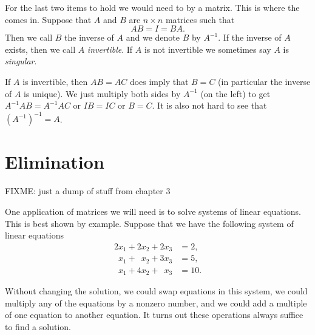 For the last two items to hold we would need to  by
a matrix.  This is where the \emph{} comes in.
Suppose that $A$ and $B$ are $n \times n$ matrices such that
\begin{equation*}
AB = I = BA .
\end{equation*}
Then we call $B$ the inverse of $A$ and we denote $B$ by $A^{-1}$.
If the inverse of $A$ exists, then we call $A$
\emph{invertible}.
If $A$ is not invertible we sometimes say $A$ is
\emph{singular}.

If $A$ is invertible, then $AB = AC$ does imply
that $B = C$ (in particular the inverse of $A$ is unique).
We just multiply both sides by $A^{-1}$ (on the left) to get
$A^{-1}AB = A^{-1}AC$ or $IB=IC$ or $B=C$.
It is also not hard to see that ${(A^{-1})}^{-1} = A$.


\sectionnewpage
\section{Elimination}
\label{elim:section}


FIXME: just a dump of stuff from chapter 3

One application of matrices we will need is to solve systems of
linear equations.  This is best shown by example.
Suppose that we have the following system of linear equations
\begin{align*}
          2 x_1 +           2 x_2 +           2 x_3 & = 2 , \\
\phantom{9} x_1 + \phantom{9} x_2 +           3 x_3 & = 5 , \\
\phantom{9} x_1 +           4 x_2 + \phantom{9} x_3 & = 10 .
\end{align*}

Without changing the solution,
we could swap equations in this system,
we could multiply any of the equations by a nonzero number, and
we could add a multiple of one equation to another equation.
It turns out these operations always suffice to find a solution.

